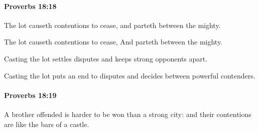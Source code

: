 		\paragraph{Proverbs 18:18} %
			\label{PROVERBS-18-18}

			The lot causeth contentions to cease, and parteth between the mighty.

			\begin{versebox}
					\item[BHS] 
					\item[ASV] The lot causeth contentions to cease, And parteth between the mighty.
					\item[NIV] Casting the lot settles disputes and keeps strong opponents apart.
					\item[NRSV] Casting the lot puts an end to disputes and decides between powerful contenders.
			\end{versebox}

		\paragraph{Proverbs 18:19} %
			\label{PROVERBS-18-19}

			A brother offended is harder to be won than a strong city: and their contentions are like the bars of a castle.

